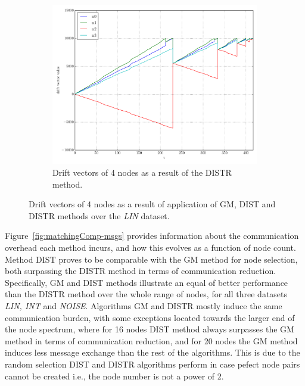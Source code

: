 \begin{figure}[H]
\begin{subfigure}{0.32\textwidth}%
  \includegraphics[width=\linewidth]{img/matchings_classic_distroptpair_drifts.pdf}
  \caption{Drift vectors of 4 nodes as a result of the DISTR method.}
\end{subfigure}
\vspace{0.5cm}
\caption{Drift vectors of 4 nodes as a result of application of GM, DIST and DISTR methods over the \emph{LIN} dataset.} \label{fig:matchingComp-drifts}
\end{figure}

Figure~\ref{fig:matchingComp-msgs} provides information about the communication overhead each method incurs, and how this evolves as a function of node count. Method DIST proves to be comparable with the GM method for node selection, both surpassing the DISTR method in terms of communication reduction. Specifically, GM and DIST methods illustrate an equal of better performance than the DISTR method over the whole range of nodes, for all three datasets \emph{LIN, INT} and \emph{NOISE}. Algorithms GM and DISTR mostly induce the same communication burden, with some exceptions located towards the larger end of the node spectrum, where for 16 nodes DIST method always surpasses the GM method in terms of communication reduction, and for 20 nodes the GM method induces less message exchange than the rest of the algorithms. This is due to the random selection DIST and DISTR algorithms perform in case pefect node pairs cannot be created i.e., the node number is not a power of 2.

